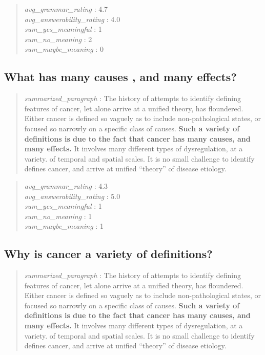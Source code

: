 \begin{quote}
\emph{avg\_grammar\_rating} : 4.7\\
\emph{avg\_answerability\_rating} : 4.0\\
\emph{sum\_yes\_meaningful} : 1\\
\emph{sum\_no\_meaning} : 2\\
\emph{sum\_maybe\_meaning} : 0
\end{quote}

\hypertarget{what-has-many-causes-and-many-effects}{%
\subsection{What has many causes , and many
effects?}\label{what-has-many-causes-and-many-effects}}

\begin{quote}
\emph{summarized\_paragraph} : The history of attempts to identify
defining features of cancer, let alone arrive at a unified theory, has
floundered. Either cancer is defined so vaguely as to include
non-pathological states, or focused so narrowly on a specific class of
causes. \textbf{Such a variety of definitions is due to the fact that
cancer has many causes, and many effects.} It involves many different
types of dysregulation, at a variety. of temporal and spatial scales. It
is no small challenge to identify defines cancer, and arrive at unified
``theory'' of disease etiology.
\end{quote}

\begin{quote}
\emph{avg\_grammar\_rating} : 4.3\\
\emph{avg\_answerability\_rating} : 5.0\\
\emph{sum\_yes\_meaningful} : 1\\
\emph{sum\_no\_meaning} : 1\\
\emph{sum\_maybe\_meaning} : 1
\end{quote}

\hypertarget{why-is-cancer-a-variety-of-definitions}{%
\subsection{Why is cancer a variety of
definitions?}\label{why-is-cancer-a-variety-of-definitions}}

\begin{quote}
\emph{summarized\_paragraph} : The history of attempts to identify
defining features of cancer, let alone arrive at a unified theory, has
floundered. Either cancer is defined so vaguely as to include
non-pathological states, or focused so narrowly on a specific class of
causes. \textbf{Such a variety of definitions is due to the fact that
cancer has many causes, and many effects.} It involves many different
types of dysregulation, at a variety. of temporal and spatial scales. It
is no small challenge to identify defines cancer, and arrive at unified
``theory'' of disease etiology.
\end{quote}

